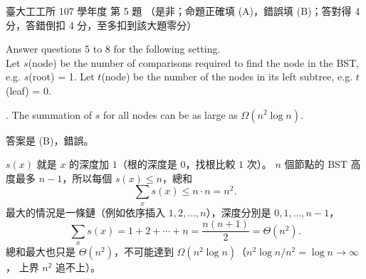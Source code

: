 \begin{pastexam}[label={px:ntu-107-ie-ds-05}]{臺大工工所 107 學年度 第 5 題}
（是非；命題正確填 (A)，錯誤填 (B)；答對得 4 分，答錯倒扣 4 分，至多扣到該大題零分）

Answer questions 5 to 8 for the following setting.\\
Let $s$(node) be the number of comparisons required to find the node in the BST, e.g. $s$(root) = 1. Let $t$(node) be the number of the nodes in its left subtree, e.g. $t$(leaf) = 0.

. The summation of $s$ for all nodes can be as large as $\Omega(n^2\log n)$.
\end{pastexam}

\begin{pastsoln}
答案是 (B)，錯誤。

$s(x)$ 就是 $x$ 的深度加 $1$（根的深度是 $0$，找根比較 $1$ 次）。 $n$ 個節點的 BST 高度最多
$n - 1$，所以每個 $s(x) \le n$，總和
\[
\sum_{x} s(x) \le n \cdot n = n^2 .
\]
最大的情況是一條鏈（例如依序插入 $1, 2, \ldots, n$），深度分別是 $0, 1, \ldots, n - 1$，
\[
\sum_{x} s(x) = 1 + 2 + \cdots + n = \frac{n(n+1)}{2} = \Theta(n^2).
\]
總和最大也只是 $\Theta(n^2)$，不可能達到 $\Omega(n^2 \log n)$（$n^2 \log n / n^2 = \log n \to \infty$，
上界 $n^2$ 追不上）。
\end{pastsoln}
